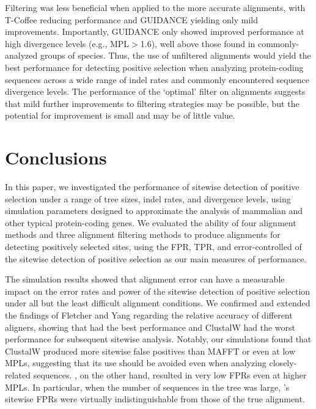 \documentclass{article}
\begin{document}
Filtering was less beneficial when applied to the more accurate
\prankc alignments, with T-Coffee reducing performance and GUIDANCE
yielding only mild \tpr improvements. Importantly, GUIDANCE only
showed improved performance at high divergence levels (e.g.,
MPL$>$1.6), well above those found in commonly-analyzed groups of
species. Thus, the use of unfiltered \prankc alignments would yield
the best performance for detecting \sw positive selection when
analyzing protein-coding sequences across a wide range of indel rates
and commonly encountered sequence divergence levels. The performance
of the `optimal' filter on \prankc alignments suggests that mild
further improvements to filtering strategies may be possible, but the
potential for improvement is small and may be of little value.

\section*{Conclusions}

In this paper, we investigated the performance of sitewise detection
of positive selection under a range of tree sizes, indel rates, and
divergence levels, using simulation parameters designed to approximate
the analysis of mammalian and other typical protein-coding genes. We
evaluated the ability of four alignment methods and three alignment
filtering methods to produce alignments for detecting positively
selected sites, using the FPR, TPR, and error-controlled \tpr of the
sitewise detection of positive selection as our main measures of
performance.

The simulation results showed that alignment error can have a
measurable impact on the error rates and power of the sitewise
detection of positive selection under all but the least difficult
alignment conditions. We confirmed and extended the findings of
Fletcher and Yang \citeyearpar{Fletcher2010Effect} regarding the
relative accuracy of different aligners, showing that \prankc had the
best performance and ClustalW had the worst performance for subsequent
sitewise analysis. Notably, our simulations found that ClustalW
produced more sitewise false positives than MAFFT or \prankc even at
low MPLs, suggesting that its use should be avoided even when
analyzing closely-related sequences. \prankc, on the other hand,
resulted in very low FPRs even at higher MPLs. In particular, when the
number of sequences in the tree was large, \prankc{}'s sitewise FPRs
were virtually indistinguishable from those of the true alignment.
\end{document}
